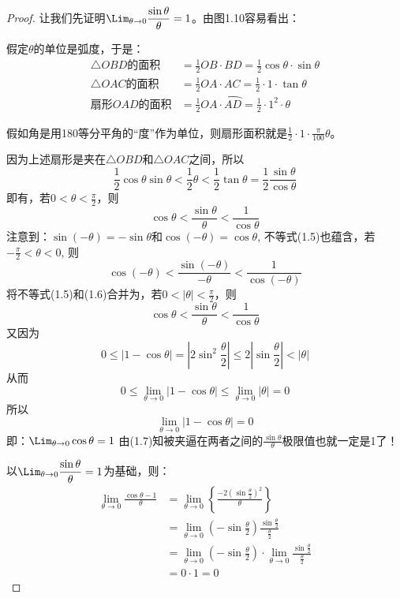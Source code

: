 \begin{proof}
    让我们先证明$\Lim_{\theta\to 0}\frac{\sin\theta }{\theta}=1$。由图1.10容易看出：

假定$\theta$的单位是弧度，于是：
\[\begin{split}
    \triangle OBD\text{的面积}&=\frac{1}{2}OB\cdot BD=\frac{1}{2}\cos\theta\cdot \sin\theta\\
    \triangle OAC\text{的面积}&=\frac{1}{2}OA\cdot AC=\frac{1}{2}\cdot 1\cdot \tan\theta\\
    \text{扇形$OAD$的面积}&=\frac{1}{2}OA\cdot \wideparen{AD}=\frac{1}{2}\cdot 1^2\cdot \theta
\end{split}\]

假如角是用180等分平角的“度”作为单位，则扇形面积就是$\frac{1}{2}\cdot 1\cdot \frac{\pi}{100}\theta$。

因为上述扇形是夹在$\triangle OBD$和$\triangle OAC$之间，所以
\begin{equation}
    \frac{1}{2}\cos\theta\sin\theta<\frac{1}{2}\theta<\frac{1}{2}\tan\theta=\frac{1}{2}\frac{\sin\theta}{\cos\theta}
\end{equation}
即有，若$0<\theta<\frac{\pi}{2}$，则
\begin{equation}
    \cos\theta<\frac{\sin\theta}{\theta}<\frac{1}{\cos\theta}
\end{equation}
注意到：$\sin(-\theta)=-\sin\theta$和$\cos(-\theta)=\cos\theta$, 不等式(1.5)也蕴含，若$-\frac{\pi}{2}<\theta<0$, 则
\begin{equation}
    \cos(-\theta)<\frac{\sin(-\theta)}{-\theta}<\frac{1}{\cos(-\theta)}
\end{equation}
将不等式(1.5)和(1.6)合并为，若$0<|\theta|<\frac{\pi}{2}$，则
\begin{equation}
    \cos\theta<\frac{\sin\theta}{\theta}<\frac{1}{\cos\theta}
\end{equation}
又因为
\[0\le |1-\cos\theta|=\left|2\sin^2\frac{\theta}{2}\right|\le 2\left|\sin\frac{\theta}{2}\right|<|\theta|\]
从而
\[0\le \lim_{\theta\to 0}|1-\cos\theta|\le \lim_{\theta\to 0}|\theta|=0\]
所以
\[\lim_{\theta\to 0}|1-\cos\theta|=0\]
即：$\Lim_{\theta\to 0}\cos\theta=1$
由(1.7)知被夹逼在两者之间的$\frac{\sin\theta}{\theta}$极限值也就一定是1了！

以$\Lim_{\theta\to 0}\frac{\sin\theta}{\theta}=1$为基础，则：
\[\begin{split}
\lim_{\theta\to 0}\frac{\cos\theta-1}{\theta}&=\lim_{\theta\to 0}\left\{\frac{-2\left(\sin\frac{\theta}{2}\right)^2}{\theta}\right\}\\
&= \lim_{\theta\to 0}\left(-\sin\frac{\theta}{2}\right)\frac{\sin\frac{\theta}{2}}{\frac{\theta}{2}}    \\
&=\lim_{\theta\to 0}\left(-\sin\frac{\theta}{2}\right)\cdot \lim_{\theta\to 0}\frac{\sin\frac{\theta}{2}}{\frac{\theta}{2}}   \\
&=0\cdot 1=0
\end{split}   
\]
\end{proof}


